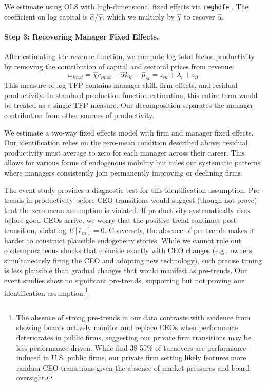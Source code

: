\documentclass[11pt,a4paper]{article}
\begin{document}
We estimate using OLS with high-dimensional fixed effects via \texttt{reghdfe} \citep{reghdfe}. The coefficient on log capital is $\hat{\alpha}/\hat{\chi}$, which we multiply by $\hat{\chi}$ to recover $\hat{\alpha}$.

\paragraph{Step 3: Recovering Manager Fixed Effects.} After estimating the revenue function, we compute log total factor productivity by removing the contribution of capital and sectoral prices from revenue:
\begin{equation}
\omega_{imst} = \hat{\chi} r_{imst} - \hat{\alpha} k_{it} - \hat{\mu}_{st} = z_m + \lambda_i + \epsilon_{it}
\end{equation}
This measure of log TFP contains manager skill, firm effects, and residual productivity. In standard production function estimation, this entire term would be treated as a single TFP measure. Our decomposition separates the manager contribution from other sources of productivity.

We estimate a two-way fixed effects model with firm and manager fixed effects. Our identification relies on the zero-mean condition described above: residual productivity must average to zero for each manager across their career. This allows for various forms of endogenous mobility but rules out systematic patterns where managers consistently join permanently improving or declining firms. 

The event study provides a diagnostic test for this identification assumption. Pre-trends in productivity before CEO transitions would suggest (though not prove) that the zero-mean assumption is violated. If productivity systematically rises before good CEOs arrive, we worry that the positive trend continues post-transition, violating $E[\bar{\epsilon}_m] = 0$. Conversely, the absence of pre-trends makes it harder to construct plausible endogeneity stories. While we cannot rule out contemporaneous shocks that coincide exactly with CEO changes (e.g., owners simultaneously firing the CEO and adopting new technology), such precise timing is less plausible than gradual changes that would manifest as pre-trends. Our event studies show no significant pre-trends, supporting but not proving our identification assumption.\footnote{The absence of strong pre-trends in our data contrasts with evidence from \citet{cornelli2013monitoring} showing boards actively monitor and replace CEOs when performance deteriorates in public firms, suggesting our private firm transitions may be less performance-driven. While \citet{jenter2021performance} find 38-55\% of turnovers are performance-induced in U.S. public firms, our private firm setting likely features more random CEO transitions given the absence of market pressures and board oversight.}
\end{document}
